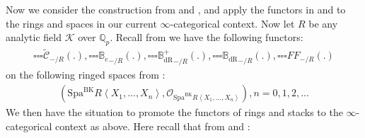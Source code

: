 \documentclass[12pt]{book}
\begin{document}
Now we consider the construction from \cite[Definition 9.3.3, Definition 9.3.5, Definition 9.3.11, Definition 9.3.9]{KL1} and \cite{KL2}, and apply the functors in \cite[Definition 9.3.3, Definition 9.3.5, Definition 9.3.11, Definition 9.3.9]{KL1} and \cite{KL2} to the rings and spaces in our current $\infty$-categorical context. Now let $R$ be any analytic field $\mathcal{K}$ over $\mathbb{Q}_p$. Recall from \cite[Definition 9.3.3, Definition 9.3.5, Definition 9.3.11, Definition 9.3.9]{KL1} we have the following functors:
\begin{align}
{\square\square\square}\widetilde{\mathcal{C}}_{-/R}(.),{\square\square\square}{\mathbb{B}_e}_{-/R}(.),{\square\square\square}{\mathbb{B}_\mathrm{dR}^+}_{-/R}(.),{\square\square\square}{\mathbb{B}_\mathrm{dR}}_{-/R}(.),{\square\square\square}{FF}_{-/R}(.)	
\end{align}
on the following ringed spaces from \cite{BK}:
\begin{align}
(\mathrm{Spa}^\mathrm{BK}R\left<X_1,...,X_n\right>,\mathcal{O}_{\mathrm{Spa}^\mathrm{BK}R\left<X_1,...,X_n\right>}),n=0,1,2,...	
\end{align}
We then have the situation to promote the functors of rings and stacks to the $\infty$-categorical context as above. Here recall that from \cite[Definition 9.3.3, Definition 9.3.5, Definition 9.3.11, Definition 9.3.9]{KL1} and \cite{KL2}:
\end{document}
